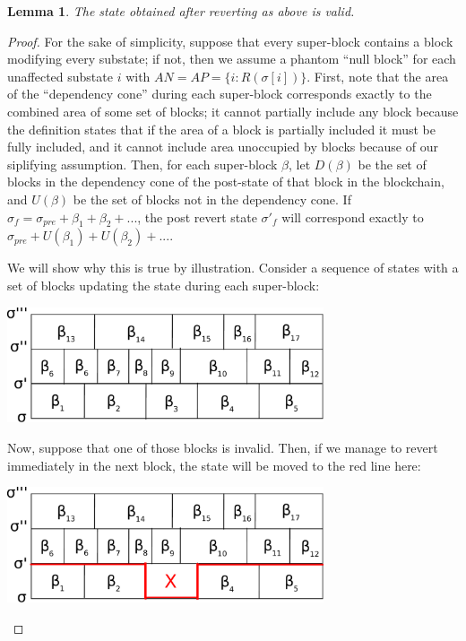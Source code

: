 \documentclass[11pt,a4paper]{report}
\theoremstyle{plain}
\newtheorem{lem}[thm]{Lemma}
\theoremstyle{definition}
\theoremstyle{remark}
\begin{document}
\begin{lem}
The state obtained after reverting as above is valid.
\end{lem}

\begin{proof}
For the sake of simplicity, suppose that every super-block contains a block modifying every substate; if not, then we assume a phantom ``null block'' for each unaffected substate $i$ with $AN = AP = \{i: R(\sigma[i])\}$. First, note that the area of the ``dependency cone'' during each super-block corresponds exactly to the combined area of some set of blocks; it cannot partially include any block because the definition states that if the area of a block is partially included it must be fully included, and it cannot include area unoccupied by blocks because of our siplifying assumption. Then, for each super-block $\beta$, let $D(\beta)$ be the set of blocks in the dependency cone of the post-state of that block in the blockchain, and $U(\beta)$ be the set of blocks not in the dependency cone. If $\sigma_f = \sigma_{pre} + \beta_1 + \beta_2 + ...$, the post revert state $\sigma'_f$ will correspond exactly to $\sigma_{pre} + U(\beta_1) + U(\beta_2) + ...$. 

We will show why this is true by illustration. Consider a sequence of states with a set of blocks updating the state during each super-block:

\begin{center}
\includegraphics[width=0.7\textwidth]{figs/pdfs/revert1.pdf}
\end{center}

Now, suppose that one of those blocks is invalid. Then, if we manage to revert immediately in the next block, the state will be moved to the red line here:

\begin{center}
\includegraphics[width=0.7\textwidth]{figs/pdfs/revert2.pdf}
\end{center}


\end{proof}
\end{document}
